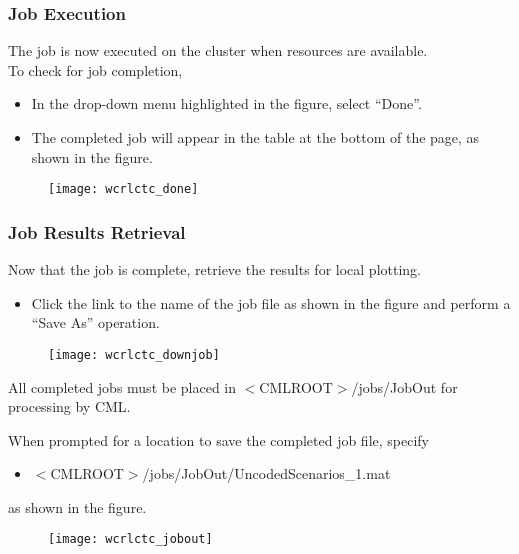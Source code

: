 \begin{frame}
  \frametitle{Job Execution}

  The job is now executed on the cluster when resources are available.\\
  To check for job completion,

  \begin{itemize}
  \item In the drop-down menu highlighted in the figure, select ``Done''.  
  \item The completed job will appear in the table at the bottom of the page, as shown in the figure.
  \end{itemize}

  \begin{figure}
    \texttt{[image: wcrlctc\_done]}
  \end{figure}

\end{frame}




\begin{frame}
  \frametitle{Job Results Retrieval}

  Now that the job is complete, retrieve the results for local plotting.
  \begin{itemize}
  \item Click the link to the name of the job file as shown in the figure and perform a ``Save As'' operation.
  \end{itemize}

  \centering
  \begin{figure}
    \texttt{[image: wcrlctc\_downjob]}
  \end{figure}

\end{frame}




\begin{frame}

  \begin{itemize_loose}
  \item All completed jobs must be placed in $<$CMLROOT$>$/jobs/JobOut for processing
    by CML.
  \item When prompted for a location to save the completed job file, specify
    \begin{itemize}
    \item $<$CMLROOT$>$/jobs/JobOut/UncodedScenarios\_1.mat
    \end{itemize}
    as shown in the figure.
  \end{itemize_loose}

  \centering
  \begin{figure}
    \texttt{[image: wcrlctc\_jobout]}
  \end{figure}

\end{frame}




